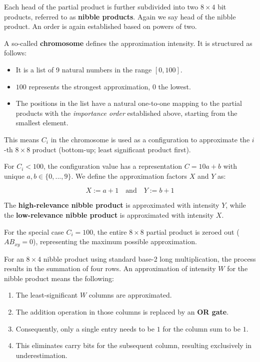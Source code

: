 \documentclass[a4paper,11pt]{article}
\begin{document}
Each head of the partial product is further subdivided into two $8 \times 4$ bit products, referred to as \textbf{nibble products}. Again we say head of the nibble product. An order is again established based on powers of two.


A so-called \textbf{chromosome} defines the approximation intensity. It is structured as follows:
\begin{itemize}
  \item It is a list of 9 natural numbers in the range $[0, 100]$.
  \item $100$ represents the strongest approximation, $0$ the lowest.
  \item The positions in the list have a natural one-to-one mapping to the partial products with the \textit{importance order} established above, starting from the smallest element.
\end{itemize}
This means $C_i$ in the chromosome is used as a configuration to approximate the $i$-th $8 \times 8$ product (bottom-up; least significant product first).

For $C_i < 100$, the configuration value has a representation $C = 10a+b$ with unique $a, b \in \{0, ..., 9\}$. We define the approximation factors $X$ and $Y$ as:

\[ X := a+1 \quad \text{and} \quad Y := b+1 \]

The \textbf{high-relevance nibble product} is approximated with intensity $Y$, while the \textbf{low-relevance nibble product} is approximated with intensity $X$.

For the special case $C_i = 100$, the entire $8 \times 8$ partial product is zeroed out ($AB_{xy} = 0$), representing the maximum possible approximation.

For an $8 \times 4$ nibble product using standard base-2 long multiplication, the process results in the summation of four rows. An approximation of intensity $W$ for the nibble product means the following:
\begin{enumerate}
  \item The least-significant $W$ columns are approximated.
  \item The addition operation in those columns is replaced by an \textbf{OR gate}.
  \item Consequently, only a single entry needs to be $1$ for the column sum to be $1$.
  \item This eliminates carry bits for the subsequent column, resulting exclusively in underestimation.
\end{enumerate}
\end{document}
